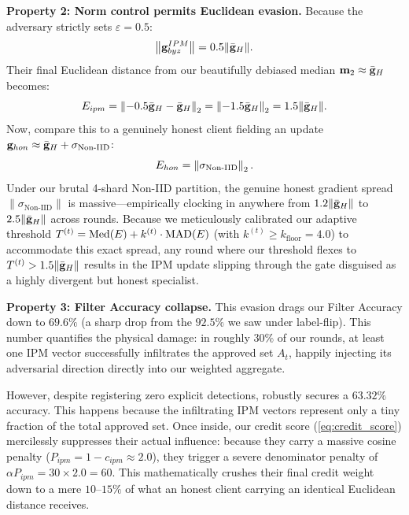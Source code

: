 \documentclass[../main.tex]{subfiles}
\begin{document}
\textbf{Property 2: Norm control permits Euclidean evasion.}
Because the adversary strictly sets $\varepsilon = 0.5$:
\begin{equation}
    \left\lVert \mathbf{g}_{byz}^{IPM} \right\rVert = 0.5\|\bar{\mathbf{g}}_{H}\|.
    \label{eq:ipm_norm_control}
\end{equation}
Their final Euclidean distance from our beautifully debiased median $\mathbf{m}_{2} \approx \bar{\mathbf{g}}_{H}$ becomes:
\begin{equation}
    E_{ipm} = \left\lVert -0.5\bar{\mathbf{g}}_{H} - \bar{\mathbf{g}}_{H} \right\rVert_2 = \left\lVert -1.5\bar{\mathbf{g}}_{H} \right\rVert_2 = 1.5\|\bar{\mathbf{g}}_{H}\|.
    \label{eq:ipm_euclidean}
\end{equation}
Now, compare this to a genuinely honest client fielding an update $\mathbf{g}_{hon} \approx \bar{\mathbf{g}}_{H} + \sigma_{\text{Non-IID}}$:
\begin{equation}
    E_{hon} = \left\lVert \sigma_{\text{Non-IID}} \right\rVert_2.
    \label{eq:honest_euclidean}
\end{equation}
Under our brutal 4-shard Non-IID partition, the genuine honest gradient spread $\|\sigma_{\text{Non-IID}}\|$ is massive---empirically clocking in anywhere from $1.2\|\bar{\mathbf{g}}_{H}\|$ to $2.5\|\bar{\mathbf{g}}_{H}\|$ across rounds. Because we meticulously calibrated our adaptive threshold $T^{(t)} = \operatorname{Med}(E) + k^{(t)} \cdot \text{MAD}(E)$ (with $k^{(t)} \geq k_{\text{floor}} = 4.0$) to accommodate this exact spread, any round where our threshold flexes to $T^{(t)} > 1.5\|\bar{\mathbf{g}}_{H}\|$ results in the IPM update slipping through the gate disguised as a highly divergent but honest specialist.

\textbf{Property 3: Filter Accuracy collapse.}
This evasion drags our Filter Accuracy down to $69.6\%$ (a sharp drop from the $92.5\%$ we saw under label-flip). This number quantifies the physical damage: in roughly $30\%$ of our rounds, at least one IPM vector successfully infiltrates the approved set $A_t$, happily injecting its adversarial direction directly into our weighted aggregate.

However, despite registering zero explicit detections, \aegis{} robustly secures a $63.32\%$ accuracy. This happens because the infiltrating IPM vectors represent only a tiny fraction of the total approved set. Once inside, our credit score (\cref{eq:credit_score}) mercilessly suppresses their actual influence: because they carry a massive cosine penalty ($P_{ipm} = 1 - c_{ipm} \approx 2.0$), they trigger a severe denominator penalty of $\alpha P_{ipm} = 30 \times 2.0 = 60$. This mathematically crushes their final credit weight down to a mere $10$--$15\%$ of what an honest client carrying an identical Euclidean distance receives.
\end{document}
